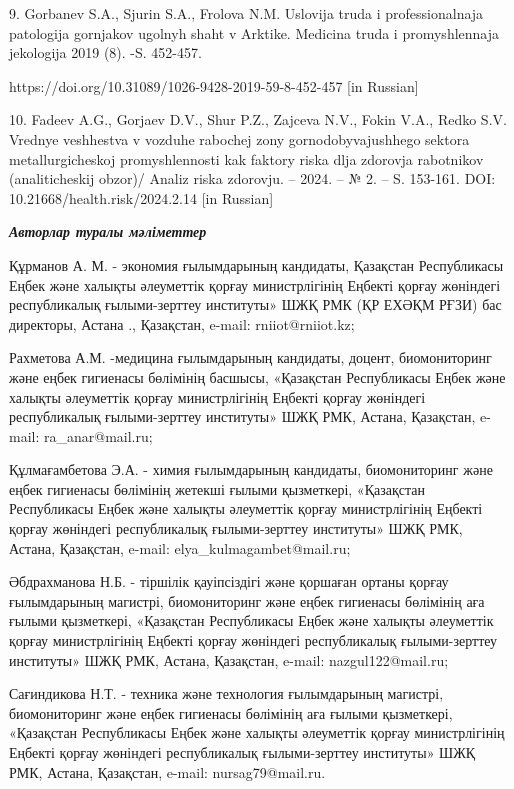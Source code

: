 \begin{noparindent}
9. Gorbanev S.A., Sjurin S.A., Frolova N.M. Uslovija truda i
professional\textquotesingle naja patologija gornjakov
ugol\textquotesingle nyh shaht v Arktike. Medicina truda i
promyshlennaja jekologija 2019 (8). -S. 452-457.

https://doi.org/10.31089/1026-9428-2019-59-8-452-457 {[}in Russian{]}

10. Fadeev A.G., Gorjaev D.V., Shur P.Z., Zajceva N.V., Fokin V.A.,
Red\textquotesingle ko S.V. Vrednye veshhestva v vozduhe rabochej zony
gornodobyvajushhego sektora metallurgicheskoj promyshlennosti kak
faktory riska dlja zdorov\textquotesingle ja rabotnikov (analiticheskij
obzor)/ Analiz riska zdorov\textquotesingle ju. -- 2024. -- № 2. -- S.
153-161. DOI: 10.21668/health.risk/2024.2.14 {[}in Russian{]}

\emph{{\bfseries Авторлар туралы мәліметтер}}

Құрманов А. М. - экономия ғылымдарының кандидаты, Қазақстан Республикасы
Еңбек және халықты әлеуметтік қорғау министрлігінің Еңбекті қорғау
жөніндегі республикалық ғылыми-зерттеу институты» ШЖҚ РМК (ҚР ЕХӘҚМ
РҒЗИ) бас директоры, Астана ., Қазақстан, e-mail: rniiot@rniiot.kz;

Рахметова А.М. -медицина ғылымдарының кандидаты, доцент, биомониторинг
және еңбек гигиенасы бөлімінің басшысы, «Қазақстан Республикасы Еңбек
және халықты әлеуметтік қорғау министрлігінің Еңбекті қорғау жөніндегі
республикалық ғылыми-зерттеу институты» ШЖҚ РМК, Астана, Қазақстан,
e-mail: ra\_anar@mail.ru;

Құлмағамбетова Э.А. - химия ғылымдарының кандидаты, биомониторинг және
еңбек гигиенасы бөлімінің жетекші ғылыми қызметкері, «Қазақстан
Республикасы Еңбек және халықты әлеуметтік қорғау министрлігінің Еңбекті
қорғау жөніндегі республикалық ғылыми-зерттеу институты» ШЖҚ РМК,
Астана, Қазақстан, e-mail: elya\_kulmagambet@mail.ru;

Әбдрахманова Н.Б. - тіршілік қауіпсіздігі және қоршаған ортаны қорғау
ғылымдарының магистрі, биомониторинг және еңбек гигиенасы бөлімінің аға
ғылыми қызметкері, «Қазақстан Республикасы Еңбек және халықты әлеуметтік
қорғау министрлігінің Еңбекті қорғау жөніндегі республикалық
ғылыми-зерттеу институты» ШЖҚ РМК, Астана, Қазақстан, e-mail:
nazgul122@mail.ru;

Сағиндикова Н.Т. - техника және технология ғылымдарының магистрі,
биомониторинг және еңбек гигиенасы бөлімінің аға ғылыми қызметкері,
«Қазақстан Республикасы Еңбек және халықты әлеуметтік қорғау
министрлігінің Еңбекті қорғау жөніндегі республикалық ғылыми-зерттеу
институты» ШЖҚ РМК, Астана, Қазақстан, e-mail: nursag79@mail.ru.
\end{noparindent}

